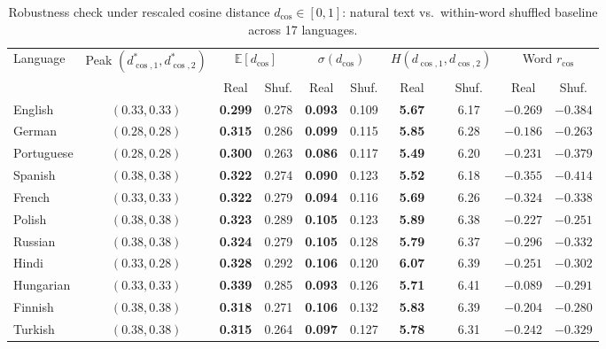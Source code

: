 \documentclass[cm]{glossa}
\begin{document}
\begin{table}[htbp]
\caption{Robustness check under rescaled cosine distance $d_{\cos} \in [0,1]$: natural text vs.\ within-word shuffled baseline across 17 languages.}
\centering\scriptsize\setlength{\tabcolsep}{4.5pt}
\begin{tabular}{lccccccccc}
\toprule
Language & Peak $(d_{\cos,1}^*, d_{\cos,2}^*)$ & \multicolumn{2}{c}{$\mathbb{E}[d_{\cos}]$} & \multicolumn{2}{c}{$\sigma(d_{\cos})$} & \multicolumn{2}{c}{$H(d_{\cos,1}, d_{\cos,2})$} & \multicolumn{2}{c}{Word $r_{\cos}$} \\
\cmidrule(lr){3-4} \cmidrule(lr){5-6} \cmidrule(lr){7-8} \cmidrule(lr){9-10}
 & & Real & Shuf. & Real & Shuf. & Real & Shuf. & Real & Shuf. \\
\midrule
English    & $(0.33, 0.33)$ & \textbf{0.299} & 0.278 & \textbf{0.093} & 0.109 & \textbf{5.67} & 6.17 & $-0.269$ & $-0.384$ \\
German     & $(0.28, 0.28)$ & \textbf{0.315} & 0.286 & \textbf{0.099} & 0.115 & \textbf{5.85} & 6.28 & $-0.186$ & $-0.263$ \\
Portuguese & $(0.28, 0.28)$ & \textbf{0.300} & 0.263 & \textbf{0.086} & 0.117 & \textbf{5.49} & 6.20 & $-0.231$ & $-0.379$ \\
Spanish    & $(0.38, 0.38)$ & \textbf{0.322} & 0.274 & \textbf{0.090} & 0.123 & \textbf{5.52} & 6.18 & $-0.355$ & $-0.414$ \\
French     & $(0.33, 0.33)$ & \textbf{0.322} & 0.279 & \textbf{0.094} & 0.116 & \textbf{5.69} & 6.26 & $-0.324$ & $-0.338$ \\
Polish     & $(0.38, 0.38)$ & \textbf{0.323} & 0.289 & \textbf{0.105} & 0.123 & \textbf{5.89} & 6.38 & $-0.227$ & $-0.251$ \\
Russian    & $(0.38, 0.38)$ & \textbf{0.324} & 0.279 & \textbf{0.105} & 0.128 & \textbf{5.79} & 6.37 & $-0.296$ & $-0.332$ \\
Hindi      & $(0.33, 0.28)$ & \textbf{0.328} & 0.292 & \textbf{0.106} & 0.120 & \textbf{6.07} & 6.39 & $-0.251$ & $-0.302$ \\
Hungarian  & $(0.33, 0.33)$ & \textbf{0.339} & 0.285 & \textbf{0.093} & 0.126 & \textbf{5.71} & 6.41 & $-0.089$ & $-0.291$ \\
Finnish    & $(0.38, 0.38)$ & \textbf{0.318} & 0.271 & \textbf{0.106} & 0.132 & \textbf{5.83} & 6.39 & $-0.204$ & $-0.280$ \\
Turkish    & $(0.38, 0.38)$ & \textbf{0.315} & 0.264 & \textbf{0.097} & 0.127 & \textbf{5.78} & 6.31 & $-0.242$ & $-0.329$ \\

\end{tabular}
\end{table}
\end{document}
